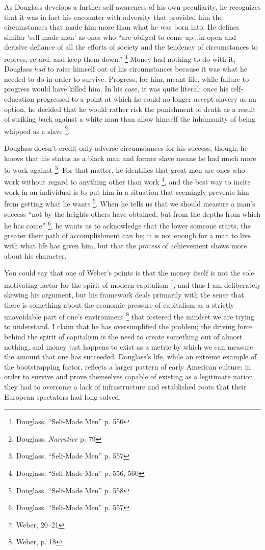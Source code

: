 As Douglass develops a further self-awareness of his own peculiarity,
he recognizes that it was in fact his encounter with adversity that
provided him the circumstances that made him more than what he was born
into. He defines similar `self-made men' as ones who ``are obliged to
come up...in open and derisive defiance of all the efforts of society
and the tendency of circumstances to repress, retard, and keep them
down.'' \footnote{Douglass, ``Self-Made Men'' p. 550} Money had nothing
to do with it; Douglass \textit{had} to raise himself out of his
circumstances because it was what he needed to do in order to survive.
Progress, for him, meant life, while failure to progress would have
killed him. In his case, it was quite literal; once his self-education
progressed to a point at which he could no longer accept slavery as an
option, he decided that he would rather risk the punishment of death as a result of striking back
against a white man than allow himself the inhumanity of being whipped
as a slave \footnote{Douglass, \textit{Narrative} p. 79}.

Douglass doesn't credit only adverse circumstances for his success,
though; he knows that his status as a black man and former slave means
he had much more to work against \footnote{Douglass, ``Self-Made Men''
p. 557}. For that matter, he identifies that great men are ones who
work without regard to anything other than work \footnote{Douglass,
``Self-Made Men'' p. 556, 560}, and the best way to incite work in an
individual is to put him in a situation that seemingly prevents him
from getting what he wants \footnote{Douglass, ``Self-Made Men'' p.
558}. When he tells us that we should measure a man's success ``not by
the heights others have obtained, but from the depths from which he has
come'' \footnote{Douglass, ``Self-Made Men'' p. 557}, he wants us to
acknowledge that the lower someone starts, the greater their path of
accomplishment can be; it is not enough for a man to live with what
life has given him, but that the \textit{process} of achievement shows
more about his character.

You could say that one of Weber's points is that the money itself is
not the sole motivating factor for the spirit of modern capitalism
\footnote{Weber, 20--21}, and thus I am deliberately skewing his
argument, but his framework deals primarily with the sense that there
is something about the economic pressure of capitalism as a strictly
unavoidable part of one's environment \footnote{Weber, p. 18} that
fostered the mindset we are trying to understand. I claim that he has
oversimplified the problem; the driving force behind the spirit of
capitalism is the need to create something out of almost nothing, and
money just happens to exist as a metric by which we can measure the
amount that one has succeeded. Douglass's life, while an extreme
example of the bootstrapping factor, reflects a larger pattern of early
American culture; in order to survive and prove themselves capable of
existing as a legitimate nation, they had to overcome a lack of
infrastructure and established roots that their European spectators had
long solved.


